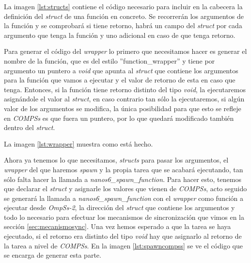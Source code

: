 La imagen \ref{lst:structs} contiene el código necesario para incluir en la cabecera la definición del \textit{struct} de una función en concreto. Se recorrerán los argumentos de la función y se comprobará si tiene retorno, habrá un campo del \textit{struct} por cada argumento que tenga la función y uno adicional en caso de que tenga retorno.
\bigskip

Para generar el código del \textit{wrapper} lo primero que necesitamos hacer es generar el nombre de la función, que es del estilo ''function\_wrapper'' y tiene por argumento un puntero a \textit{void} que apunta al \textit{struct} que contiene los argumentos para la función que vamos a ejecutar y el valor de retorno de esta en caso que tenga. Entonces, si la función tiene retorno distinto del tipo \textit{void}, la ejecutaremos asignándole el valor al \textit{struct}, en caso contrario tan sólo la ejecutaremos, si algún valor de los argumentos se modifica, la única posibilidad para que esto se refleje en \textit{COMPSs} es que fuera un puntero, por lo que quedará modificado también dentro del \textit{struct}.

\begin{comment} 
se generará \textit{struct\_->ret =}, y a continuación se genera la llamada a la función y se efectúa el paso de argumentos en caso que los haya. Para acceder a los argumentos de la función desde el compilador, se utiliza el campo de la estructura \textit{function}: \textit{first\_argument}. Recorrerá los argumentos que están enlazados entre sí de forma semejante a una lista (tan solo que no está doblemente enlazada), hasta que llegue al final.
\end{comment}
\smallskip
La imagen \ref{lst:wrapper} muestra como está hecho.

\bigskip

Ahora ya tenemos lo que necesitamos, \textit{structs} para pasar los argumentos, el \textit{wrapper} del que haremos \textit{spawn} y la propia tarea que se acabará ejecutando, tan sólo falta hacer la llamada a \textit{nanos6\_spawn\_function}. Para hacer esto, tenemos que declarar el \textit{struct} y asignarle los valores que vienen de \textit{COMPSs}, acto seguido se generará la llamada a \textit{nanos6\_spawn\_function} con el \textit{wrapper} como función a ejecutar desde \textit{OmpSs-2}, la dirección del \textit{struct} que contiene los argumentos y todo lo necesario para efectuar los mecanismos de sincronización que vimos en la sección \ref{sec:mecanismosync}. Una vez hemos esperado a que la tarea se haya ejecutado, si el retorno era distinto del tipo \textit{void} hay que asignarlo al retorno de la tarea a nivel de \textit{COMPSs}. En la imagen \ref{lst:spawncompss} se ve el código que se encarga de generar esta parte.


